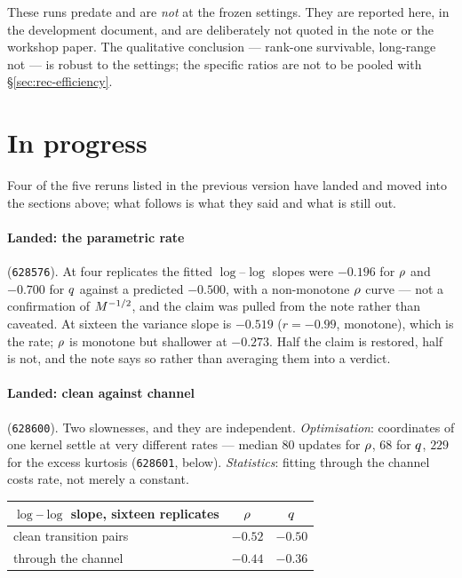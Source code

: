 \begin{pitfall}
These runs predate  and are \emph{not} at the frozen settings. They
are reported here, in the development document, and are deliberately not quoted in the note or
the workshop paper. The qualitative conclusion --- rank-one survivable, long-range not --- is
robust to the settings; the specific ratios are not to be pooled with
\S\ref{sec:rec-efficiency}.
\end{pitfall}

\section{In progress}
\label{sec:pending}

Four of the five reruns listed in the previous version have landed and moved into the sections
above; what follows is what they said and what is still out.

\paragraph{Landed: the parametric rate} (\texttt{628576}). At four replicates the fitted
$\log$--$\log$ slopes were $-0.196$ for $\rho$ and $-0.700$ for $q$ against a predicted
$-0.500$, with a non-monotone $\rho$ curve --- not a confirmation of $M^{-1/2}$, and the
claim was pulled from the note rather than caveated. At sixteen the variance slope is $-0.519$
($r=-0.99$, monotone), which is the rate; $\rho$ is monotone but shallower at $-0.273$. Half the
claim is restored, half is not, and the note says so rather than averaging them into a verdict.

\paragraph{Landed: clean against channel} (\texttt{628600}). Two slownesses, and they are
independent. \emph{Optimisation}: coordinates of one kernel settle at very different rates ---
median $80$ updates for $\rho$, $68$ for $q$, $229$ for the excess kurtosis
(\texttt{628601}, below). \emph{Statistics}: fitting through the channel costs rate, not merely a
constant.

\begin{center}\small
\begin{tabular}{@{}lcc@{}}
\toprule
$\log$--$\log$ slope, sixteen replicates & $\rho$ & $q$ \\
\midrule
clean transition pairs & $-0.52$ & $-0.50$ \\
through the channel    & $-0.44$ & $-0.36$ \\
\bottomrule
\end{tabular}
\end{center}

